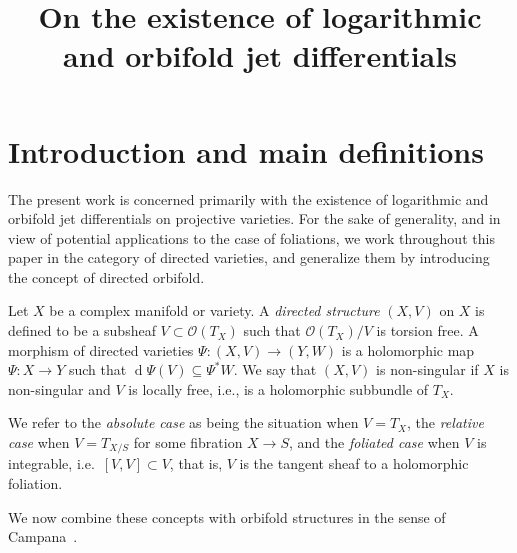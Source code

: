 \documentclass[AHL,Unicode,longabstracts,published]{cedram}
\title[On the existence of logarithmic and orbifold jet differentials] {On the existence of logarithmic and orbifold jet differentials}
\author[\initial{F.} \lastname{Campana}]{\firstname{Frédéric} \lastname{Campana}}
\author[\initial{L.} \lastname{Darondeau}]{\firstname{Lionel} \lastname{Darondeau}}
\author[\initial{J.-P.} \lastname{Demailly}]{\firstname{Jean-Pierre} \lastname{Demailly}}
\author[\initial{E.} \lastname{Rousseau}]{\firstname{Erwan} \lastname{Rousseau}}
\DeclareMathOperator{\diff}{d}
\newcommand*\cO{\mathcal{O}}
\begin{document}
\maketitle

\section{Introduction and main definitions}
The present work is concerned primarily with the existence of logarithmic and orbifold jet differentials on projective varieties. For the sake of generality, and in view of potential applications to the case of foliations, we work throughout this paper in the category of directed varieties, and generalize them by introducing the concept of directed orbifold.

\begin{defi}
Let $X$ be a complex manifold or variety. A \emph{directed structure} $(X,V)$ on $X$ is defined to be a subsheaf $V\subset\cO(T_X)$ such that $\cO(T_X)/V$ is torsion free. A morphism of directed varieties $\Psi\colon(X,V)\to (Y,W)$ is a holomorphic map $\Psi\colon X\to Y$ such that $\diff\Psi(V)\subseteq\Psi^*W$. We say that $(X,V)$ is non-singular if $X$ is non-singular and $V$ is locally free, i.e., is a holomorphic subbundle of $T_X$.
\end{defi}

We refer to the \emph{absolute case} as being the situation when $V=T_X$, the \emph{relative case} when $V=T_{X/S}$ for some fibration $X\to S$, and the \emph{foliated case} when $V$ is integrable, i.e.\ $[V,V]\subset V$, that is, $V$ is the tangent sheaf to a holomorphic foliation.

We now combine these concepts with orbifold structures in the sense of Campana~\cite{Cam04}.
\end{document}
